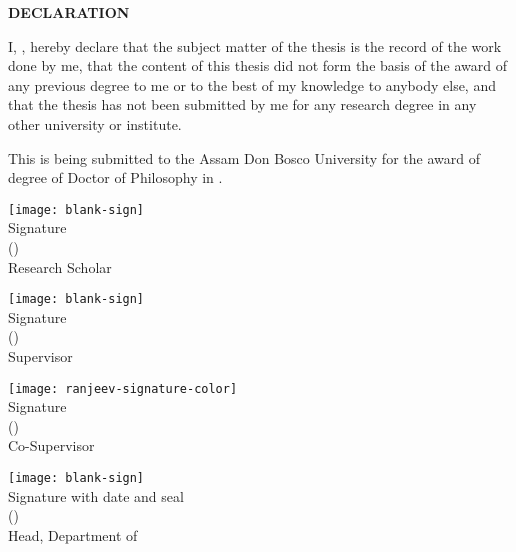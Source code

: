 \begin{titlepage}
    \begin{center}
        {\bf \LARGE DECLARATION}
    \end{center}

    \par
    I, \textit{\authorname}, hereby declare that the subject matter of the thesis is the record of the work done by me, that the content of this thesis did not form the basis of the award of any previous degree to me or to the best of my knowledge to anybody else, and that the thesis has not been submitted by me for any research degree in any other university or institute.
    
    \par
    This is being submitted to the Assam Don Bosco University for the award of degree of Doctor of Philosophy in \department.
    
    \vspace*{10mm}
    \begin{flushleft}
    	\texttt{[image: blank-sign]}\vspace{-3mm}\\
        Signature\\
        (\authorname)\\
        Research Scholar %
    \end{flushleft}
    
    \vspace*{5mm}
    \begin{minipage}{0.3\textwidth}
    	\texttt{[image: blank-sign]}\vspace{-3mm}\\
    	Signature\\
		(\supervisor)\\
		Supervisor
    \end{minipage}
    \hfill
    \begin{minipage}{0.3\textwidth}
    	\texttt{[image: ranjeev-signature-color]}\vspace{-3mm}\\
		Signature\\
		(\cosupervisor)\\
		Co-Supervisor
    \end{minipage}
        
    \vspace*{5mm}
    \begin{flushleft}
    	\texttt{[image: blank-sign]}\vspace{-3mm}\\
        Signature with date and seal\\
        (\headofdepartment)\\
        Head, Department of \department
    \end{flushleft}

\end{titlepage}